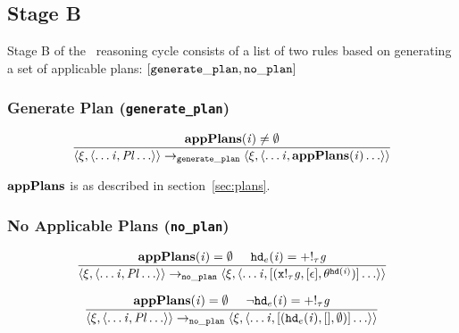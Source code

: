 \subsection{Stage B}

Stage B of the \gwendolen\ reasoning cycle consists of a list of two rules based on generating a set of applicable plans: $[ {\tt generate\_plan}, {\tt no\_plan} ]$

\subsubsection*{Generate Plan ({\tt generate\_plan})}

\begin{equation}
  \frac{\mathbf{appPlans}(\mathit{i}) \neq \emptyset}{
    \langle \xi, \langle \ldots \mathit{i}, \mathit{Pl} \ldots \rangle \rangle \rightarrow_{\tt generate\_plan}
\langle \xi, \langle \ldots \mathit{i}, \mathbf{appPlans}(\mathit{i}) \ldots \rangle \rangle}
\end{equation}

$\mathbf{appPlans}$ is as described in section~\ref{sec:plans}.

\subsubsection*{No Applicable Plans ({\tt no\_plan})}

\begin{equation}
\frac{\mathbf{appPlans}(\mathit{i}) = \emptyset
\hspace{0.5cm}
{\tt hd}_e(\mathit{i}) = \mathit{+!_{\tau}\mathit{g}}
}{\langle \xi, \langle \ldots \mathit{i}, \mathit{Pl} \ldots \rangle \rangle \rightarrow_{\tt no\_plan} 
\langle \xi, \langle \ldots \mathit{i}, [(\mathit{\mathtt{x}!_{\tau}\mathit{g}}, [\epsilon], \theta^{{\tt hd}(\mathit{i})})] \ldots \rangle \rangle}
\end{equation}

\begin{equation}
\frac{\mathbf{appPlans}(\mathit{i}) = \emptyset
\hspace{0.5cm}
\neg {\tt hd}_e(\mathit{i}) = \mathit{+!_{\tau}\mathit{g}}
}{\langle \xi, \langle \ldots \mathit{i}, \mathit{Pl} \ldots \rangle \rangle \rightarrow_{\tt no\_plan} 
\langle \xi, \langle \ldots \mathit{i}, [({\tt hd}_e(\mathit{i}), [], \emptyset)] \ldots \rangle \rangle}
\end{equation}


